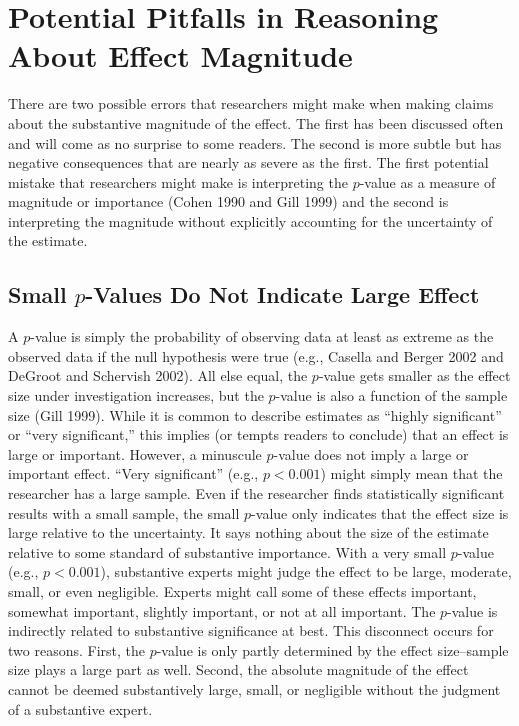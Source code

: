 \documentclass[12pt]{article}
\begin{document}
\section*{Potential Pitfalls in Reasoning About Effect Magnitude}

There are two possible errors that researchers might make when making claims about the substantive magnitude of the effect. The first has been discussed often and will come as no surprise to some readers. The second is more subtle but has negative consequences that are nearly as severe as the first. The first potential mistake that researchers might make is interpreting the $p$-value as a measure of magnitude or importance (Cohen 1990 and Gill 1999) and the second is interpreting the magnitude without explicitly accounting for the uncertainty of the estimate. 

\subsection*{Small $p$-Values Do Not Indicate Large Effect}

A $p$-value is simply the probability of observing data at least as extreme as the observed data if the null hypothesis were true (e.g., Casella and Berger 2002 and DeGroot and Schervish 2002). All else equal, the $p$-value gets smaller as the effect size under investigation increases, but the $p$-value is also a function of the sample size (Gill 1999). While it is common to describe estimates as ``highly significant'' or ``very significant,'' this implies (or tempts readers to conclude) that an effect is large or important. However, a minuscule $p$-value does not imply a large or important effect. ``Very significant'' (e.g., $p < 0.001$) might simply mean that the researcher has a large sample. Even if the researcher finds statistically significant results with a small sample, the small $p$-value only indicates that the effect size is large relative to the uncertainty. It says nothing about the size of the estimate relative to some standard of substantive importance. With a very small $p$-value (e.g., $p < 0.001$), substantive experts might judge the effect to be large, moderate, small, or even negligible. Experts might call some of these effects important, somewhat important, slightly important, or not at all important. The $p$-value is indirectly related to substantive significance at best. This disconnect occurs for two reasons. First, the $p$-value is only partly determined by the effect size--sample size plays a large part as well. Second, the absolute magnitude of the effect cannot be deemed substantively large, small, or negligible without the judgment of a substantive expert.
\end{document}

